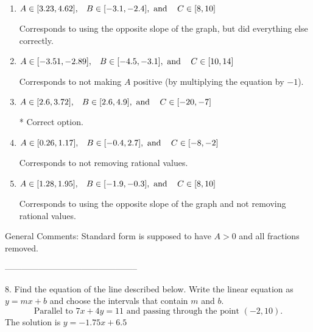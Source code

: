 \documentclass{article}[10pt]
\begin{document}
\begin{enumerate}[label=\Alph*.] 
\item $ A \in [3.23, 4.62], \hspace{3mm} B \in [-3.1, -2.4], \text{ and } \hspace{3mm} C \in [8, 10] $ 

  Corresponds to using the opposite slope of the graph, but did everything else correctly. 
\item $ A \in [-3.51, -2.89], \hspace{3mm} B \in [-4.5, -3.1], \text{ and } \hspace{3mm} C \in [10, 14] $ 

  Corresponds to not making $A$ positive (by multiplying the equation by $-1$). 
\item $ A \in [2.6, 3.72], \hspace{3mm} B \in [2.6, 4.9], \text{ and } \hspace{3mm} C \in [-20, -7] $ 

 * Correct option. 
\item $ A \in [0.26, 1.17], \hspace{3mm} B \in [-0.4, 2.7], \text{ and } \hspace{3mm} C \in [-8, -2] $ 

  Corresponds to not removing rational values. 
\item $ A \in [1.28, 1.95], \hspace{3mm} B \in [-1.9, -0.3], \text{ and } \hspace{3mm} C \in [8, 10] $ 

  Corresponds to using the opposite slope of the graph and not removing rational values. 
\end{enumerate} 
 
General Comments: Standard form is supposed to have $A > 0$ and all fractions removed.

-----------------------------------------------

8. Find the equation of the line described below. Write the linear equation as $ y=mx+b $ and choose the intervals that contain $m$ and $b$.
$$ \text{Parallel to } 7 x + 4 y = 11 \text{ and passing through the point } (-2, 10). $$ 
The solution is $ y = -1.75 x + 6.5 $ 
\end{document}
